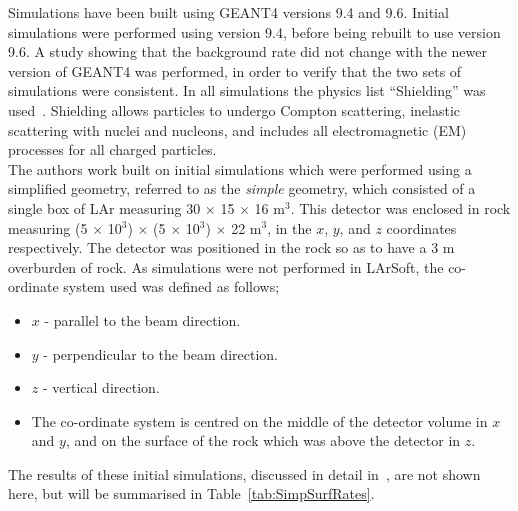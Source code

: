 Simulations have been built using GEANT4 versions 9.4 and 9.6. Initial simulations were performed using version 9.4, before being rebuilt to use version 9.6. A study showing that the background rate did not change with the newer version of GEANT4 was performed, in order to verify that the two sets of simulations were consistent. In all simulations the physics list ``Shielding'' was used~\citep{Shielding}. Shielding allows particles to undergo Compton scattering, inelastic scattering with nuclei and nucleons, and includes all electromagnetic (EM) processes for all charged particles. \\

The authors work built on initial simulations which were performed using a simplified geometry, referred to as the \emph{simple} geometry, which consisted of a single box of LAr measuring 30 $\times$ 15 $\times$ 16 m$^3$. This detector was enclosed in rock measuring (5 $\times$ 10$^3$) $\times$ (5 $\times$ 10$^3$) $\times$ 22 m$^{3}$, in the $x$, $y$, and $z$ coordinates respectively. The detector was positioned in the rock so as to have a 3 m overburden of rock. As simulations were not performed in LArSoft, the co-ordinate system used was defined as follows;
\begin{itemize}
\item $x$ - parallel to the beam direction.
\item $y$ - perpendicular to the beam direction.
\item $z$ - vertical direction.
\item The co-ordinate system is centred on the middle of the detector volume in $x$ and $y$, and on the surface of the rock which was above the detector in $z$.
\end{itemize}
The results of these initial simulations, discussed in detail in~\citep{MartinsThesis}, are not shown here, but will be summarised in Table~\ref{tab:SimpSurfRates}. \\

